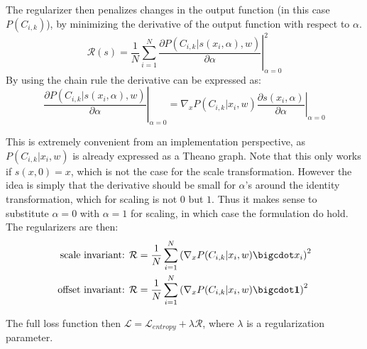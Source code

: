 The regularizer then penalizes changes in the output function (in this case $P(C_{i, k})$), by minimizing the derivative of the output function with respect to $\alpha$.
\begin{equation}
\mathcal{R}(s) = \frac{1}{N} \sum_{i=1}^N \left. \frac{\partial P(C_{i, k} | s(x_i, \alpha), w)}{\partial \alpha} \right|^2_{\alpha=0}
\end{equation}
By using the chain rule the derivative can be expressed as:
\begin{equation*}
\left. \frac{\partial P(C_{i, k} | s(x_i, \alpha), w)}{\partial \alpha} \right|_{\alpha=0} = \left.\nabla_x P(C_{i, k} |  x_i, w) \frac{\partial s(x_i, \alpha)}{\partial \alpha} \right|_{\alpha=0}
\end{equation*}

This is extremely convenient from an implementation perspective, as $P(C_{i, k} | x_i, w)$ is already expressed as a Theano graph. Note that this only works if $s(x, 0) = x$, which is not the case for the scale transformation. However the idea is simply that the derivative should be small for $\alpha$'s around the identity transformation, which for scaling is not $0$ but $1$. Thus it makes sense to substitute $\alpha = 0$ with $\alpha = 1$ for scaling, in which case the formulation do hold. The regularizers are then: 
\begin{align}
\text{scale invariant: }& \mathcal{R} = \frac{1}{N} \sum_{i=1}^N \left(\nabla_x P(C_{i, k} | x_i, w) \bigcdot x_i\right)^2 \\
\text{offset invariant: }& \mathcal{R} = \frac{1}{N} \sum_{i=1}^N \left(\nabla_x P(C_{i, k} | x_i, w) \bigcdot \mathbf{1}\right)^2
\end{align}

The full loss function then $\mathcal{L} = \mathcal{L}_{entropy} + \lambda \mathcal{R}$, where $\lambda$ is a regularization parameter.
